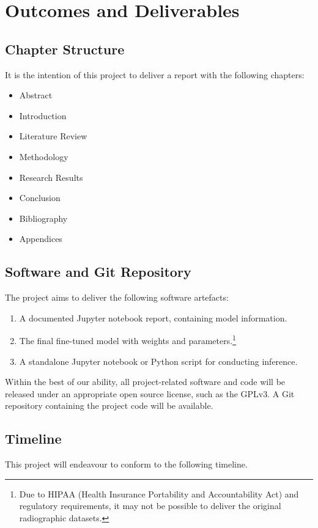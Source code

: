 \chapter{Outcomes and Deliverables}

\section{Chapter Structure}

It is the intention of this project to deliver a report with the following chapters:

\begin{itemize}
    \item Abstract
    \item Introduction
    \item Literature Review
    \item Methodology
    \item Research Results
    \item Conclusion
    \item Bibliography 
    \item Appendices
\end{itemize}

\section{Software and Git Repository}

The project aims to deliver the following software artefacts:

\begin{enumerate}
    \item A documented Jupyter notebook report, containing model information.
    \item The final fine-tuned model with weights and parameters.\footnote{Due to HIPAA (Health Insurance Portability and Accountability Act) and regulatory requirements, it may not be possible to deliver the original radiographic datasets.}
    \item A standalone Jupyter notebook or Python script for conducting inference.
\end{enumerate}

\noindent
Within the best of our ability, all project-related software and code will be released under an appropriate open source license, such as the GPLv3. A Git repository containing the project code will be available. 

\section{Timeline}
This project will endeavour to conform to the following timeline.

